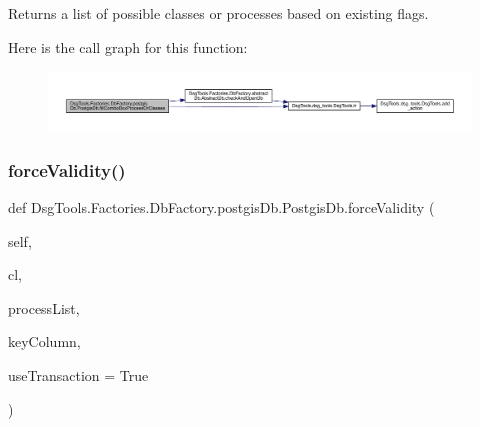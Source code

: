 \begin{DoxyVerb}Returns a list of possible classes or processes
based on existing flags.
\end{DoxyVerb}
 Here is the call graph for this function\+:
\nopagebreak
\begin{figure}[H]
\begin{center}
\leavevmode
\includegraphics[width=350pt]{class_dsg_tools_1_1_factories_1_1_db_factory_1_1postgis_db_1_1_postgis_db_a9fdc672cb1a4843cd39798739f33d2f9_cgraph}
\end{center}
\end{figure}
\mbox{\label{class_dsg_tools_1_1_factories_1_1_db_factory_1_1postgis_db_1_1_postgis_db_a0f61c48440ee4fa26614b6adf7d55429}} 
\subsubsection{\texorpdfstring{force\+Validity()}{forceValidity()}}
{\footnotesize\ttfamily def Dsg\+Tools.\+Factories.\+Db\+Factory.\+postgis\+Db.\+Postgis\+Db.\+force\+Validity (\begin{DoxyParamCaption}\item[{}]{self,  }\item[{}]{cl,  }\item[{}]{process\+List,  }\item[{}]{key\+Column,  }\item[{}]{use\+Transaction = {\ttfamily True} }\end{DoxyParamCaption})}

